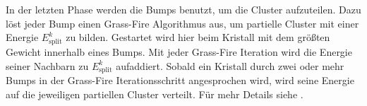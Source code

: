 \documentclass[a4paper,11pt,oneside,final,german,openbib,pdftex]{scrbook}
\begin{document}
{ In der letzten Phase werden die Bumps benutzt, um die Cluster aufzuteilen. Dazu l\"ost jeder Bump einen Grass-Fire Algorithmus aus, um partielle Cluster mit einer Energie $E^k_{\text{split}}$ zu bilden. Gestartet wird hier beim Kristall mit dem gr\"o{\ss}ten Gewicht innerhalb eines Bumps. Mit jeder Grass-Fire Iteration wird die Energie seiner Nachbarn zu $E^k_\text{{split}}$ aufaddiert. Sobald ein Kristall durch zwei oder mehr Bumps in der Grass-Fire Iterationsschritt angesprochen wird, wird seine Energie auf die jeweiligen partiellen Cluster verteilt. 
 F\"ur mehr Details siehe \cite{Ne17}.
 

}
\end{document}
